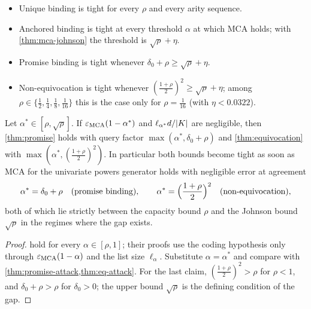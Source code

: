 \begin{itemize}
\item Unique binding is tight for every $\rho$ and every arity sequence.
\item Anchored binding is tight at every threshold $\alpha$ at which MCA holds; with
\cref{thm:mca-johnson} the threshold is $\sqrt\rho+\eta$.
\item Promise binding is tight whenever $\delta_0+\rho\ge\sqrt\rho+\eta$.
\item Non-equivocation is tight whenever $(\frac{1+\rho}2)^2\ge\sqrt\rho+\eta$; among
$\rho\in\{\frac12,\frac14,\frac18,\frac1{16}\}$ this is the case only for $\rho=\frac1{16}$
(with $\eta<0.0322$).
\end{itemize}

\begin{proposition}\label{prop:gap-mca}
Let $\alpha^\ast\in[\rho,\sqrt\rho]$. If $\varepsilon_{\mathrm{MCA}}(1-\alpha^\ast)$ and
$\ell_{\alpha^\ast}d/|K|$ are negligible, then \cref{thm:promise} holds with query
factor $\max(\alpha^\ast,\delta_0+\rho)$ and \cref{thm:equivocation} with
$\max(\alpha^\ast,(\frac{1+\rho}2)^2)$. In particular both bounds become tight as soon as
MCA for the univariate powers generator holds with negligible error at agreement
\[
\alpha^\ast=\delta_0+\rho\quad\text{(promise binding)},\qquad
\alpha^\ast=\Bigl(\frac{1+\rho}2\Bigr)^2\quad\text{(non-equivocation)},
\]
both of which lie strictly between the capacity bound $\rho$ and the Johnson bound
$\sqrt\rho$ in the regimes where the gap exists.
\end{proposition}

\begin{proof}
 hold for every $\alpha\in[\rho,1]$; their proofs use
the coding hypothesis only through $\varepsilon_{\mathrm{MCA}}(1-\alpha)$ and the list size
$\ell_\alpha$. Substitute $\alpha=\alpha^\ast$ and compare with
\cref{thm:promise-attack,thm:eq-attack}. For the last claim, $(\frac{1+\rho}2)^2>\rho$
for $\rho<1$, and $\delta_0+\rho>\rho$ for $\delta_0>0$; the upper bound $\sqrt\rho$ is the
defining condition of the gap.
\end{proof}
